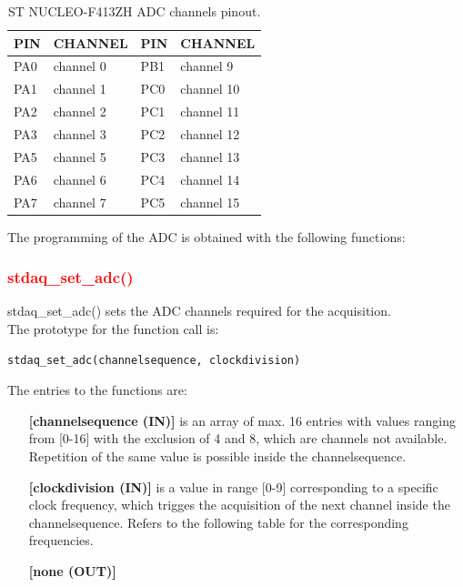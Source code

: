 \documentclass[letterpaper,10pt,english]{hitec}
\begin{document}
\begin{table}[h]
\caption{ST NUCLEO-F413ZH ADC channels pinout.}
\centering
\begin{tabular}{|ll|ll|}
 \textbf{PIN} & \textbf{CHANNEL} & \textbf{PIN} & \textbf{CHANNEL} \\ \hline
 PA0 & channel 0 & PB1 & channel 9 \\
 PA1 & channel 1 & PC0 & channel 10 \\
 PA2 & channel 2 & PC1 & channel 11 \\
 PA3 & channel 3 & PC2 & channel 12 \\
 PA5 & channel 5 & PC3 & channel 13 \\
 PA6 & channel 6 & PC4 & channel 14 \\
 PA7 & channel 7 & PC5 & channel 15 
\end{tabular}
\end{table}
The programming of the ADC is obtained with the following functions:

\subsubsection{\textcolor{red}{stdaq\_set\_adc()}}

stdaq\_set\_adc() sets the ADC channels required for the acquisition. \\
The prototype for the function call is: 
\begin{verbatim}
stdaq_set_adc(channelsequence, clockdivision)
\end{verbatim}
The entries to the functions are:
\begin{itemize}
\item [\textbf{[channelsequence (IN)]}] is an array of max. 16 entries with values ranging from [0-16] with the exclusion of 4 and 8, which are channels not available. Repetition of the same value is possible inside the channelsequence.
\item [\textbf{[clockdivision (IN)]}] is a value in range [0-9] corresponding to a specific clock frequency, which trigges the acquisition of the next channel inside the channelsequence. Refers to the following table for the corresponding frequencies.
\item [\textbf{[none (OUT)]}]
\end{itemize}
\end{document}
